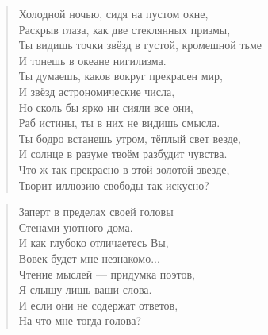 \documentclass[14pt, a4paper]{extarticle}
\begin{document}
\newpage

\begin{verse}
    Холодной ночью, сидя на пустом окне,\\
    Раскрыв глаза, как две стеклянных призмы,\\
    Ты видишь точки звёзд в густой, кромешной тьме\\
    И тонешь в океане нигилизма.\\[4mm]

    Ты думаешь, каков вокруг прекрасен мир,\\
    И звёзд астрономические числа,\\
    Но сколь бы ярко ни сияли все они,\\
    Раб истины, ты в них не видишь смысла.\\[4mm]

    Ты бодро встанешь утром, тёплый свет везде,\\
    И солнце в разуме твоём разбудит чувства.\\
    Что ж так прекрасно в этой золотой звезде,\\
    Творит иллюзию свободы так искусно?\\
\end{verse}

\newpage

\begin{verse}
    Заперт в пределах своей головы\\
    Стенами уютного дома.\\
    И как глубоко отличаетесь Вы,\\
    Вовек будет мне незнакомо...\\[4mm]

    Чтение мыслей — придумка поэтов,\\
    Я слышу лишь ваши слова.\\
    И если они не содержат ответов,\\
    На что мне тогда голова?\\
\end{verse}
\end{document}

